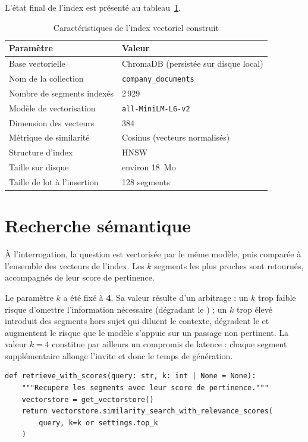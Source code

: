 L'état final de l'index est présenté au tableau~\ref{tab:index}.

\begin{table}[htbp]
\centering
\caption{Caractéristiques de l'index vectoriel construit}
\label{tab:index}
\small
\begin{tabularx}{\textwidth}{@{}p{5.4cm}X@{}}
\toprule
\textbf{Paramètre} & \textbf{Valeur} \\
\midrule
Base vectorielle & ChromaDB (persistée sur disque local) \\
Nom de la collection & \texttt{company\_documents} \\
Nombre de segments indexés & 2\,929 \\
Modèle de vectorisation & \texttt{all-MiniLM-L6-v2} \\
Dimension des vecteurs & 384 \\
Métrique de similarité & Cosinus (vecteurs normalisés) \\
Structure d'index & HNSW \\
Taille sur disque & environ 18~Mo \\
Taille de lot à l'insertion & 128 segments \\
\bottomrule
\end{tabularx}
\end{table}

\section{Recherche sémantique}

À l'interrogation, la question est vectorisée par le même modèle, puis comparée à
l'ensemble des vecteurs de l'index. Les $k$ segments les plus proches sont
retournés, accompagnés de leur score de pertinence.

Le paramètre $k$ a été fixé à \textbf{4}. Sa valeur résulte d'un arbitrage :
un $k$ trop faible risque d'omettre l'information nécessaire (dégradant le
) ; un $k$ trop élevé introduit des segments hors sujet qui
diluent le contexte, dégradent le  et augmentent le
risque que le modèle s'appuie sur un passage non pertinent. La valeur $k = 4$
constitue par ailleurs un compromis de latence : chaque segment
supplémentaire allonge l'invite et donc le temps de génération.

\begin{lstlisting}[style=python,caption={Recherche avec scores (\texttt{src/rag/retriever.py})}]
def retrieve_with_scores(query: str, k: int | None = None):
    """Recupere les segments avec leur score de pertinence."""
    vectorstore = get_vectorstore()
    return vectorstore.similarity_search_with_relevance_scores(
        query, k=k or settings.top_k
    )
\end{lstlisting}

